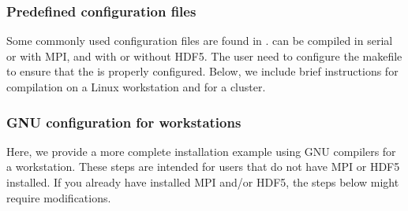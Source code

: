 \documentclass[letterpaper,10pt,english]{sphinxmanual}
\begin{document}
\subsubsection{Pre\sphinxhyphen{}defined configuration files}
\label{\detokenize{Base/Installation:pre-defined-configuration-files}}
\sphinxAtStartPar
Some commonly used configuration files are found in .
 can be compiled in serial or with MPI, and with or without HDF5.
The user need to configure the  makefile to ensure that the  is properly configured.
Below, we include brief instructions for compilation on a Linux workstation and for a cluster.


\subsubsection{GNU configuration for workstations}
\label{\detokenize{Base/Installation:gnu-configuration-for-workstations}}
\sphinxAtStartPar
Here, we provide a more complete installation example using GNU compilers for a workstation.
These steps are intended for users that do not have MPI or HDF5 installed.
If you already have installed MPI and/or HDF5, the steps below might require modifications.
\end{document}

